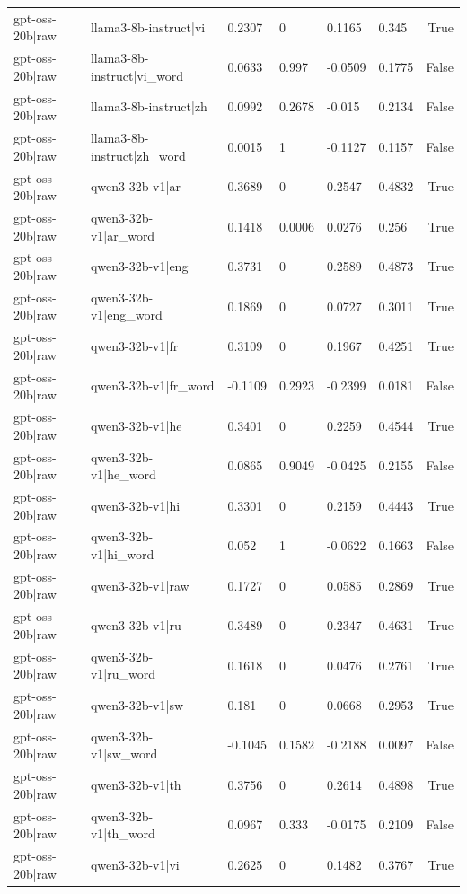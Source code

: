 \begin{table}
\begin{tabular}{llllllr}
gpt-oss-20b|raw & llama3-8b-instruct|vi & 0.2307 & 0 & 0.1165 & 0.345 & True \\
gpt-oss-20b|raw & llama3-8b-instruct|vi_word & 0.0633 & 0.997 & -0.0509 & 0.1775 & False \\
gpt-oss-20b|raw & llama3-8b-instruct|zh & 0.0992 & 0.2678 & -0.015 & 0.2134 & False \\
gpt-oss-20b|raw & llama3-8b-instruct|zh_word & 0.0015 & 1 & -0.1127 & 0.1157 & False \\
gpt-oss-20b|raw & qwen3-32b-v1|ar & 0.3689 & 0 & 0.2547 & 0.4832 & True \\
gpt-oss-20b|raw & qwen3-32b-v1|ar_word & 0.1418 & 0.0006 & 0.0276 & 0.256 & True \\
gpt-oss-20b|raw & qwen3-32b-v1|eng & 0.3731 & 0 & 0.2589 & 0.4873 & True \\
gpt-oss-20b|raw & qwen3-32b-v1|eng_word & 0.1869 & 0 & 0.0727 & 0.3011 & True \\
gpt-oss-20b|raw & qwen3-32b-v1|fr & 0.3109 & 0 & 0.1967 & 0.4251 & True \\
gpt-oss-20b|raw & qwen3-32b-v1|fr_word & -0.1109 & 0.2923 & -0.2399 & 0.0181 & False \\
gpt-oss-20b|raw & qwen3-32b-v1|he & 0.3401 & 0 & 0.2259 & 0.4544 & True \\
gpt-oss-20b|raw & qwen3-32b-v1|he_word & 0.0865 & 0.9049 & -0.0425 & 0.2155 & False \\
gpt-oss-20b|raw & qwen3-32b-v1|hi & 0.3301 & 0 & 0.2159 & 0.4443 & True \\
gpt-oss-20b|raw & qwen3-32b-v1|hi_word & 0.052 & 1 & -0.0622 & 0.1663 & False \\
gpt-oss-20b|raw & qwen3-32b-v1|raw & 0.1727 & 0 & 0.0585 & 0.2869 & True \\
gpt-oss-20b|raw & qwen3-32b-v1|ru & 0.3489 & 0 & 0.2347 & 0.4631 & True \\
gpt-oss-20b|raw & qwen3-32b-v1|ru_word & 0.1618 & 0 & 0.0476 & 0.2761 & True \\
gpt-oss-20b|raw & qwen3-32b-v1|sw & 0.181 & 0 & 0.0668 & 0.2953 & True \\
gpt-oss-20b|raw & qwen3-32b-v1|sw_word & -0.1045 & 0.1582 & -0.2188 & 0.0097 & False \\
gpt-oss-20b|raw & qwen3-32b-v1|th & 0.3756 & 0 & 0.2614 & 0.4898 & True \\
gpt-oss-20b|raw & qwen3-32b-v1|th_word & 0.0967 & 0.333 & -0.0175 & 0.2109 & False \\
gpt-oss-20b|raw & qwen3-32b-v1|vi & 0.2625 & 0 & 0.1482 & 0.3767 & True \\

\end{tabular}
\end{table}
